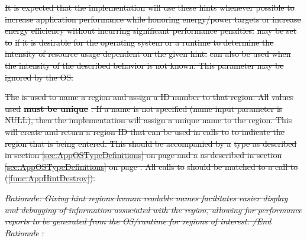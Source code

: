 \documentclass[12pt]{report} %
\providecommand{\DIFdeltex}[1]{{\protect\color{red}\sout{#1}}}                      %
\providecommand{\DIFdel}[1]{\texorpdfstring{\DIFdeltex{#1}}{}} %
\begin{document}
\DIFdel{It is expected that the implementation will use these hints whenever possible to increase application performance 
while honoring energy/power targets or increase energy efficiency without incurring significant performance penalties.
 }%
\DIFdel{may be set to }%
\DIFdel{if it is desirable for the operating system or a runtime to determine the intensity of resource usage dependent
on the given hint. }%
\DIFdel{can also be used when the intensity of the described behavior is 
not known. This parameter may be ignored by the OS.
}%

\DIFdel{The }%
\DIFdel{is used to name a region and assign a ID number to that region.
All }%
\DIFdel{values used }\textbf{\DIFdel{must be unique}}%
\DIFdel{.
If a name is not specified (name input parameter is NULL), then the implementation will assign a unique name to the region.
This will create and return a region ID that can be used in calls to }%
\DIFdel{to indicate
the region that is being entered.
This should be accompanied by a }%
\DIFdel{type as described in section \ref{sec:AppOSTypeDefinitions} on page \pageref{type:RegionHint} and
a }%
\DIFdel{as described in section \ref{sec:AppOSTypeDefinitions} on page \pageref{type:RegionIntensity}.
All calls to }%
\DIFdel{should be matched to a call to }%
\DIFdel{(\ref{func:AppHintDestroy}). 
}%

\emph{\DIFdel{Rationale: Giving hint regions human readable names facilitates easier display and debugging of information associated with the region,
allowing for performance reports to be generated from the OS/runtime for regions of interest. /End Rationale}}%
\DIFdel{.
}%

\end{document}
